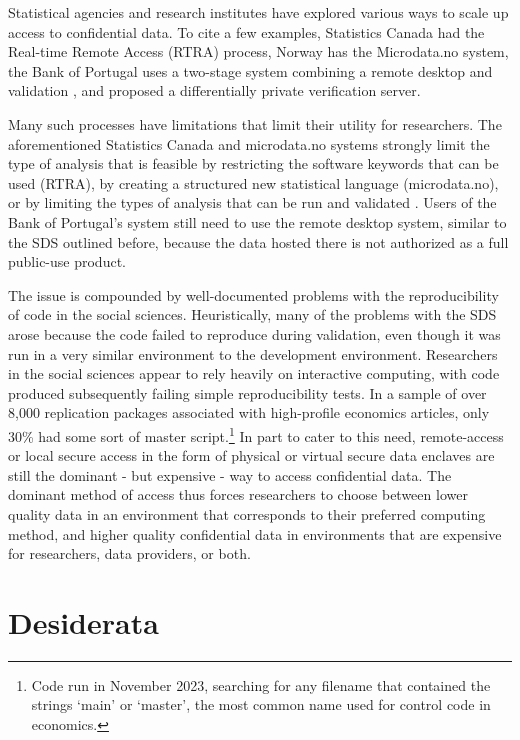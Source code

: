 \documentclass{article}
\begin{document}
Statistical agencies and research institutes have explored various ways to scale up access to confidential data. To cite a few examples, Statistics Canada had the Real-time Remote Access (RTRA) process, Norway has the Microdata.no system, the Bank of Portugal uses a two-stage system combining a remote desktop and validation \citep{guimaraes_reproducibility_2023}, and \citet{barrientos_providing_2018} proposed a differentially private verification server. 

Many such processes have limitations that limit their utility for researchers. The aforementioned Statistics Canada and microdata.no systems strongly limit the type of analysis that is feasible by restricting the software keywords that can be used (RTRA), by creating a structured new statistical language (microdata.no), or by limiting the types of analysis that can be run and validated \citep{barrientos_providing_2018}. Users of the Bank of Portugal's system still need to use the remote desktop system, similar to the SDS outlined before, because the data hosted there is not authorized as a full public-use product.

The issue is compounded by well-documented problems with the reproducibility of code in the social sciences. Heuristically, many of the problems with the SDS arose because the code failed to reproduce during validation, even though it was  run in a very similar environment to the development environment. Researchers in the social sciences appear to rely heavily on interactive computing, with code produced subsequently failing simple reproducibility tests. In a sample of over 8,000 replication packages associated with high-profile economics articles, only 30\% had some sort of master script.\footnote{Code run in November 2023, searching for any filename that contained the strings `main' or `master', the most common name used for control code in economics.} In part to cater to this need, remote-access or local secure access in the form of physical or virtual secure data enclaves are still the dominant - but expensive - way to access confidential data. The dominant method of access thus forces researchers to choose between lower quality data in an environment that corresponds to their preferred computing method, and higher quality confidential data in environments that are expensive for researchers, data providers, or both.

\section{Desiderata}
\label{sec:desiderata}
\end{document}
